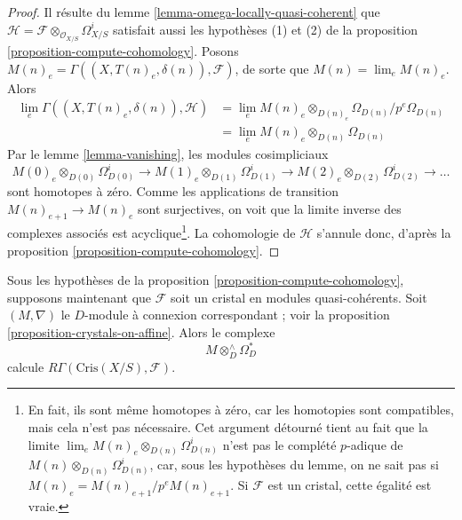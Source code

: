 \begin{proof}
Il résulte du lemme \ref{lemma-omega-locally-quasi-coherent} que
$\mathcal{H} = \mathcal{F} \otimes_{\mathcal{O}_{X/S}} \Omega^i_{X/S}$
satisfait aussi les hypothèses (1) et (2) de la
proposition \ref{proposition-compute-cohomology}.
Posons $M(n)_e = \Gamma((X, T(n)_e, \delta(n)), \mathcal{F})$,
de sorte que $M(n) = \lim_e M(n)_e$. Alors
\begin{align*}
\lim_e \Gamma((X, T(n)_e, \delta(n)), \mathcal{H}) & =
\lim_e M(n)_e \otimes_{D(n)_e} \Omega_{D(n)}/p^e\Omega_{D(n)} \\
& = \lim_e M(n)_e \otimes_{D(n)} \Omega_{D(n)}
\end{align*}
Par le
lemme \ref{lemma-vanishing},
les modules cosimpliciaux
$$
M(0)_e \otimes_{D(0)} \Omega^i_{D(0)} \to
M(1)_e \otimes_{D(1)} \Omega^i_{D(1)} \to
M(2)_e \otimes_{D(2)} \Omega^i_{D(2)} \to \ldots
$$
sont homotopes à zéro. Comme les applications de transition
$M(n)_{e + 1} \to M(n)_e$ sont surjectives, on voit que
la limite inverse des complexes associés est acyclique\footnote{En fait,
ils sont même homotopes à zéro, car les homotopies sont compatibles, mais cela n'est pas
nécessaire. Cet argument détourné tient au fait que
la limite $\lim_e M(n)_e \otimes_{D(n)} \Omega^i_{D(n)}$ n'est pas le
complété $p$-adique de $M(n) \otimes_{D(n)} \Omega^i_{D(n)}$, car, sous
les hypothèses du lemme, on ne sait pas si
$M(n)_e = M(n)_{e + 1}/p^eM(n)_{e + 1}$. Si $\mathcal{F}$ est un cristal,
cette égalité est vraie.}.
La cohomologie de $\mathcal{H}$ s'annule donc, d'après la
proposition \ref{proposition-compute-cohomology}.
\end{proof}

\begin{proposition}
\label{proposition-compute-cohomology-crystal}
Sous les hypothèses de la proposition \ref{proposition-compute-cohomology},
supposons maintenant que $\mathcal{F}$ soit un cristal en modules quasi-cohérents.
Soit $(M, \nabla)$ le $D$-module à connexion correspondant ; voir la
proposition \ref{proposition-crystals-on-affine}. Alors le complexe
$$
M \otimes^\wedge_D \Omega^*_D
$$
calcule $R\Gamma(\text{Cris}(X/S), \mathcal{F})$.
\end{proposition}

